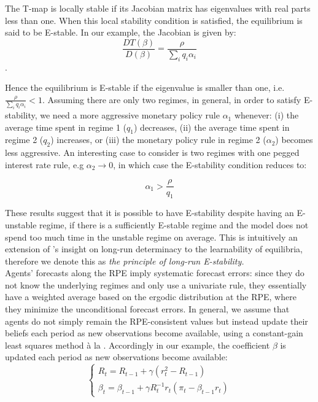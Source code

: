 \documentclass[12pt,reqno]{article}
\numberwithin{equation}{section}
\begin{document}
The T-map is locally stable if its Jacobian matrix has eigenvalues with real parts less than one. When this local stability condition is satisfied, the equilibrium is said to be E-stable. In our example, the Jacobian is given by: \\

$$ \frac{DT(\beta)}{D(\beta)} = \frac{\rho}{\sum_i q_i \alpha_i} $$. 

Hence the equilibrium is E-stable if the eigenvalue is smaller than one, i.e. $\frac{\rho}{\sum_i q_i \alpha_i} < 1 $.  Assuming there are only two regimes, in general, in order to satisfy E-stability, we need a more aggressive monetary policy rule $\alpha_1 $ whenever: (i) the average time spent in regime 1 ($q_1 $) decreases, (ii) the average time spent in regime 2 ($q_2 $) increases, or (iii) the monetary policy rule in regime 2 ($\alpha_2 $) becomes less aggressive. An interesting case to consider is two regimes with one pegged interest rate rule, e.g $\alpha_2 \rightarrow 0 $, in which case the E-stability condition reduces to: 

$$ \alpha_1 > \frac{\rho}{q_1} $$

These results suggest that it is possible to have E-stability despite having an E-unstable regime, if there is a sufficiently E-stable regime and the model does not spend too much time in the unstable regime on average. This is intuitively an extension of \citeauthor{davig2007generalizing}’s insight on long-run determinacy to the learnability of equilibria, therefore we denote this as  \textit{the principle of long-run E-stability.} \\

\noindent
Agents' forecasts along the RPE imply systematic forecast errors: since they do not know the underlying regimes and only use a univariate rule, they essentially have a weighted average based on the ergodic distribution at the RPE, where they minimize the unconditional forecast errors. In general, we assume that agents do not simply remain the RPE-consistent values but instead update their beliefs each period as new observations become available, using a constant-gain least squares method à la \cite{evans2012learning}. Accordingly in our example, the coefficient $\beta$ is updated each period as new observations become available: \\

$$
\begin{cases}

R_t = R_{t-1} + \gamma (r_t^2 - R_{t-1} ) \\
\beta_t = \beta_{t-1} + \gamma R_t^{-1} r_t (\pi_t - \beta_{t-1} r_t) 
\end{cases}
$$
\end{document}
